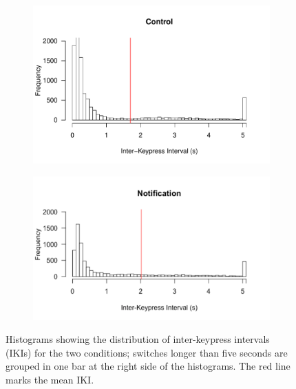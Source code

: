 \begin{figure}
\centering
\begin{subfigure}{0.5\textwidth}
\centerline{\includegraphics[scale=0.6]{images/ch56/ch56-histIKIs_Control.pdf}}
\end{subfigure}
\begin{subfigure}{0.5\textwidth}
\centerline{\includegraphics[scale=0.5]{images/ch56/ch56-histIKIs_Not.pdf}}
\end{subfigure}
\caption[Study 6 distribution of IKIs]{Histograms showing the distribution of inter-keypress intervals (IKIs) for the two conditions; switches longer than five seconds are grouped in one bar at the right side of the histograms. The red line marks the mean IKI.}
\label{fig:ch56-histikis}
\end{figure}

